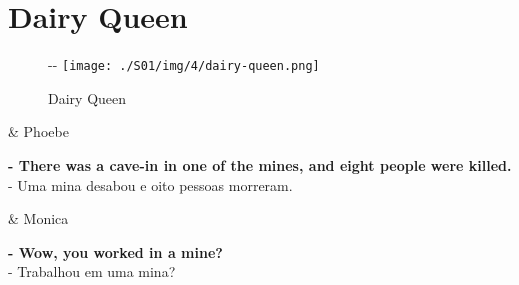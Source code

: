 \hypertarget{dairy-queen}{%
\section{Dairy Queen}\label{dairy-queen}}

\begin{figure}[!ht]
  \begin{adjustwidth}{-\oddsidemargin-1in}{-\rightmargin}
    \centering
    \texttt{[image: ./S01/img/4/dairy-queen.png]}
    \caption{Dairy Queen\label{fig:dairy-queen}}
  \end{adjustwidth}
\end{figure}

\begin{tcolorbox}[enhanced,center upper,
    drop fuzzy shadow southeast, boxrule=0.3pt,
    lower separated=false,
    colframe=black!30!dialogoBorder,colback=white]
\begin{minipage}[c]{0.14\linewidth}
   & \centering \scriptsize{Phoebe}
\end{minipage}
\hspace{.1mm}
\begin{minipage}[c]{0.8\linewidth}
  \textbf{- There was a cave-in in one of the mines, and eight people were killed.}\\
  - Uma mina desabou e oito pessoas morreram.
\end{minipage}

\medskip
\begin{minipage}[c]{0.14\linewidth}
   & \centering \scriptsize{Monica}
\end{minipage}
\hspace{.1mm}
\begin{minipage}[c]{0.8\linewidth}
  \textbf{- Wow, you worked in a mine?}\\
  - Trabalhou em uma mina?
\end{minipage}


\end{tcolorbox}
